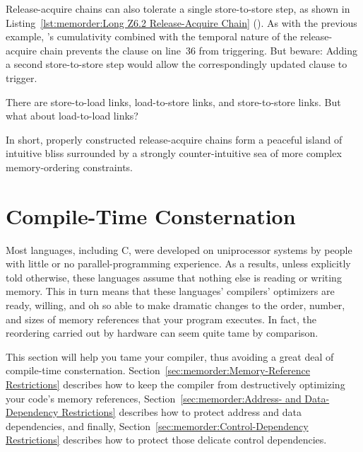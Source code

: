 Release-acquire chains can also tolerate a single store-to-store step,
as shown in
Listing~\ref{lst:memorder:Long Z6.2 Release-Acquire Chain}
().
As with the previous example, 's cumulativity
combined with the temporal nature of the release-acquire chain
prevents the  clause on line~36 from triggering.
But beware: Adding a second store-to-store step would allow the correspondingly
updated  clause to trigger.


\QuickQuiz{}
	There are store-to-load links, load-to-store links, and
	store-to-store links.
	But what about load-to-load links?
 \QuickQuizEnd

In short, properly constructed release-acquire chains form a peaceful
island of intuitive bliss surrounded by a strongly counter-intuitive
sea of more complex memory-ordering constraints.


\section{Compile-Time Consternation}
\label{sec:memorder:Compile-Time Consternation}

Most languages, including C, were developed on uniprocessor systems
by people with little or no parallel-programming experience.
As a results, unless explicitly told otherwise, these languages assume
that nothing else is reading or writing memory.
This in turn means that these languages' compilers' optimizers
are ready, willing, and oh so able to make dramatic changes to the
order, number, and sizes of memory references that your program
executes.
In fact, the reordering carried out by hardware can seem quite tame
by comparison.

This section will help you tame your compiler, thus avoiding a great
deal of compile-time consternation.
Section~\ref{sec:memorder:Memory-Reference Restrictions}
describes how to keep the compiler from destructively optimizing
your code's memory references,
Section~\ref{sec:memorder:Address- and Data-Dependency Restrictions}
describes how to protect address and data dependencies,
and finally,
Section~\ref{sec:memorder:Control-Dependency Restrictions}
describes how to protect those delicate control dependencies.

